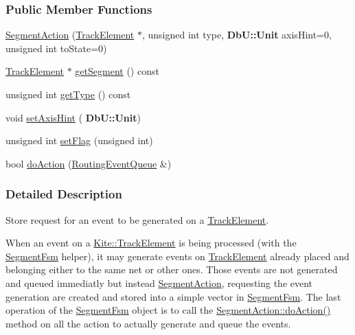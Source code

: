 \subsubsection*{Public Member Functions}
\begin{DoxyCompactItemize}
\item 
\hyperlink{classKite_1_1SegmentAction_acbeca58f8327b69a540628f299d5bd35}{Segment\+Action} (\hyperlink{classKite_1_1TrackElement}{Track\+Element} $\ast$, unsigned int type, \textbf{ Db\+U\+::\+Unit} axis\+Hint=0, unsigned int to\+State=0)
\item 
\hyperlink{classKite_1_1TrackElement}{Track\+Element} $\ast$ \hyperlink{classKite_1_1SegmentAction_a506a4d1cef59fc35984c1c88e0c0f6df}{get\+Segment} () const
\item 
unsigned int \hyperlink{classKite_1_1SegmentAction_a093e88be27fab140cca8ec652beab529}{get\+Type} () const
\item 
void \hyperlink{classKite_1_1SegmentAction_a8dc7cdf5f643a856fa5208bcfd1f8342}{set\+Axis\+Hint} (\textbf{ Db\+U\+::\+Unit})
\item 
unsigned int \hyperlink{classKite_1_1SegmentAction_a4e1f44319a9a0a413fe1413a87ec78bd}{set\+Flag} (unsigned int)
\item 
bool \hyperlink{classKite_1_1SegmentAction_a324f17f0f5a09b76344eb2e003695d74}{do\+Action} (\hyperlink{classKite_1_1RoutingEventQueue}{Routing\+Event\+Queue} \&)
\end{DoxyCompactItemize}


\subsubsection{Detailed Description}
Store request for an event to be generated on a \hyperlink{classKite_1_1TrackElement}{Track\+Element}. 

When an event on a \hyperlink{classKite_1_1TrackElement}{Kite\+::\+Track\+Element} is being processed (with the \hyperlink{classKite_1_1SegmentFsm}{Segment\+Fsm} helper), it may generate events on \hyperlink{classKite_1_1TrackElement}{Track\+Element} already placed and belonging either to the same net or other ones. Those events are not generated and queued immediatly but instead \hyperlink{classKite_1_1SegmentAction}{Segment\+Action}, requesting the event generation are created and stored into a simple vector in \hyperlink{classKite_1_1SegmentFsm}{Segment\+Fsm}. The last operation of the \hyperlink{classKite_1_1SegmentFsm}{Segment\+Fsm} object is to call the \hyperlink{classKite_1_1SegmentAction_a324f17f0f5a09b76344eb2e003695d74}{Segment\+Action\+::do\+Action()} method on all the action to actually generate and queue the events. 

